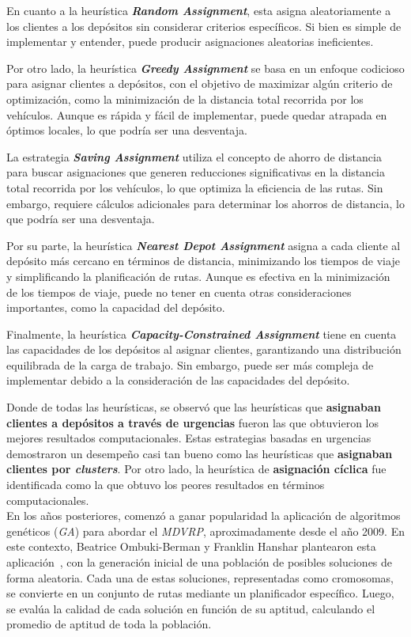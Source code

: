 \documentclass[letter, 10pt]{article}
\begin{document}
En cuanto a la heurística \textbf{\textit{Random Assignment}}, esta asigna aleatoriamente a los clientes a los depósitos sin considerar criterios específicos. Si bien es simple de implementar y entender, puede producir asignaciones aleatorias ineficientes.

Por otro lado, la heurística \textbf{\textit{Greedy Assignment}} se basa en un enfoque codicioso para asignar clientes a depósitos, con el objetivo de maximizar algún criterio de optimización, como la minimización de la distancia total recorrida por los vehículos. Aunque es rápida y fácil de implementar, puede quedar atrapada en óptimos locales, lo que podría ser una desventaja.

La estrategia \textbf{\textit{Saving Assignment}} utiliza el concepto de ahorro de distancia para buscar asignaciones que generen reducciones significativas en la distancia total recorrida por los vehículos, lo que optimiza la eficiencia de las rutas. Sin embargo, requiere cálculos adicionales para determinar los ahorros de distancia, lo que podría ser una desventaja.

Por su parte, la heurística \textbf{\textit{Nearest Depot Assignment}} asigna a cada cliente al depósito más cercano en términos de distancia, minimizando los tiempos de viaje y simplificando la planificación de rutas. Aunque es efectiva en la minimización de los tiempos de viaje, puede no tener en cuenta otras consideraciones importantes, como la capacidad del depósito.

Finalmente, la heurística \textbf{\textit{Capacity-Constrained Assignment}} tiene en cuenta las capacidades de los depósitos al asignar clientes, garantizando una distribución equilibrada de la carga de trabajo. Sin embargo, puede ser más compleja de implementar debido a la consideración de las capacidades del depósito.

Donde de todas las heurísticas, se observó que las heurísticas que \textbf{asignaban clientes a depósitos a través de urgencias} fueron las que obtuvieron los mejores resultados computacionales. Estas estrategias basadas en urgencias demostraron un desempeño casi tan bueno como las heurísticas que \textbf{asignaban clientes por \textit{clusters}}. Por otro lado, la heurística de \textbf{asignación cíclica} fue identificada como la que obtuvo los peores resultados en términos computacionales.
\\

En los años posteriores, comenzó a ganar popularidad la aplicación de algoritmos genéticos (\textit{GA}) para abordar el \textit{MDVRP}, aproximadamente desde el año 2009. En este contexto, Beatrice Ombuki-Berman y Franklin Hanshar plantearon esta aplicación~\cite{GeneticAlgorithms2009}, con la generación inicial de una población de posibles soluciones de forma aleatoria. Cada una de estas soluciones, representadas como cromosomas, se convierte en un conjunto de rutas mediante un planificador específico. Luego, se evalúa la calidad de cada solución en función de su aptitud, calculando el promedio de aptitud de toda la población.
\end{document}
